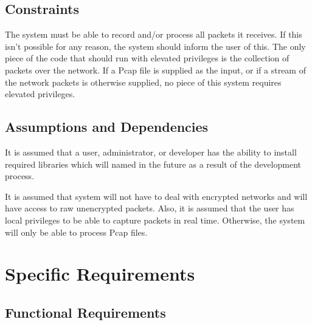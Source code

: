 \documentclass[titlepage]{article}
\begin{document}

\subsection{Constraints%
  \label{constraints}%
}

The system must be able to record and/or process all packets it receives.  If
this isn't possible for any reason, the system should inform the user of this.
The only piece of the code that should run with elevated privileges is the
collection of packets over the network.  If a Pcap file is supplied as the
input, or if a stream of the network packets is otherwise supplied, no piece of
this system requires elevated privileges.


\subsection{Assumptions and Dependencies%
  \label{assumptions-and-dependencies}%
}

It is assumed that a user, administrator, or developer has the ability to
install required libraries which will named in the future as a result of the
development process.

It is assumed that system will not have to deal with encrypted networks and
will have access to raw unencrypted packets. Also, it is assumed that the user
has local privileges to be able to capture packets in real time. Otherwise, the
system will only be able to process Pcap files.


\section{Specific Requirements%
  \label{specific-requirements}%
}


\subsection{Functional Requirements%
    \label{functional}%
}

\end{document}
